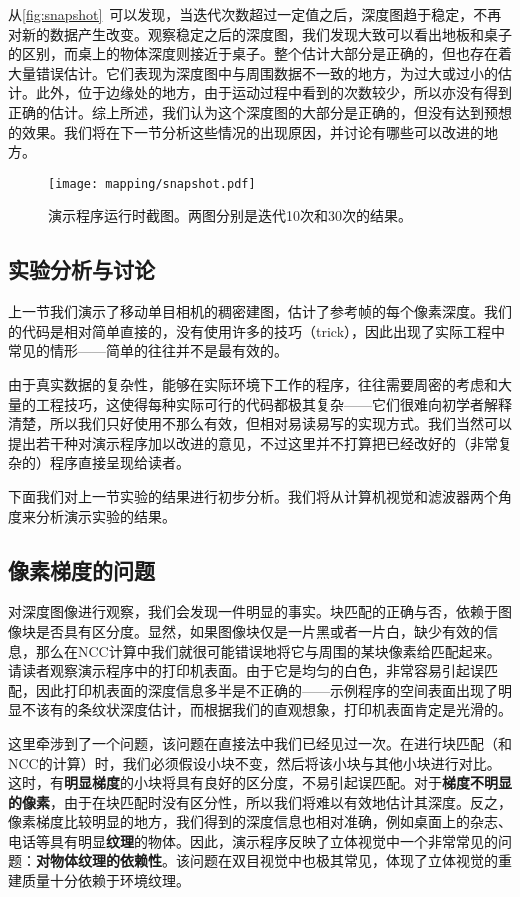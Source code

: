 从\autoref{fig:snapshot}~可以发现，当迭代次数超过一定值之后，深度图趋于稳定，不再对新的数据产生改变。观察稳定之后的深度图，我们发现大致可以看出地板和桌子的区别，而桌上的物体深度则接近于桌子。整个估计大部分是正确的，但也存在着大量错误估计。它们表现为深度图中与周围数据不一致的地方，为过大或过小的估计。此外，位于边缘处的地方，由于运动过程中看到的次数较少，所以亦没有得到正确的估计。综上所述，我们认为这个深度图的大部分是正确的，但没有达到预想的效果。我们将在下一节分析这些情况的出现原因，并讨论有哪些可以改进的地方。

\begin{figure}[!ht]
	\centering
	\texttt{[image: mapping/snapshot.pdf]}
	\caption{演示程序运行时截图。两图分别是迭代10次和30次的结果。}
	\label{fig:snapshot}
\end{figure}

\subsection{实验分析与讨论}
上一节我们演示了移动单目相机的稠密建图，估计了参考帧的每个像素深度。我们的代码是相对简单直接的，没有使用许多的技巧（trick），因此出现了实际工程中常见的情形——简单的往往并不是最有效的。

由于真实数据的复杂性，能够在实际环境下工作的程序，往往需要周密的考虑和大量的工程技巧，这使得每种实际可行的代码都极其复杂——它们很难向初学者解释清楚，所以我们只好使用不那么有效，但相对易读易写的实现方式。我们当然可以提出若干种对演示程序加以改进的意见，不过这里并不打算把已经改好的（非常复杂的）程序直接呈现给读者。

下面我们对上一节实验的结果进行初步分析。我们将从计算机视觉和滤波器两个角度来分析演示实验的结果。

\subsection{像素梯度的问题}
对深度图像进行观察，我们会发现一件明显的事实。块匹配的正确与否，依赖于图像块是否具有区分度。显然，如果图像块仅是一片黑或者一片白，缺少有效的信息，那么在NCC计算中我们就很可能错误地将它与周围的某块像素给匹配起来。请读者观察演示程序中的打印机表面。由于它是均匀的白色，非常容易引起误匹配，因此打印机表面的深度信息多半是不正确的——示例程序的空间表面出现了明显不该有的条纹状深度估计，而根据我们的直观想象，打印机表面肯定是光滑的。

这里牵涉到了一个问题，该问题在直接法中我们已经见过一次。在进行块匹配（和NCC的计算）时，我们必须假设小块不变，然后将该小块与其他小块进行对比。这时，有\textbf{明显梯度}的小块将具有良好的区分度，不易引起误匹配。对于\textbf{梯度不明显的像素}，由于在块匹配时没有区分性，所以我们将难以有效地估计其深度。反之，像素梯度比较明显的地方，我们得到的深度信息也相对准确，例如桌面上的杂志、电话等具有明显\textbf{纹理}的物体。因此，演示程序反映了立体视觉中一个非常常见的问题：\textbf{对物体纹理的依赖性}。该问题在双目视觉中也极其常见，体现了立体视觉的重建质量十分依赖于环境纹理。

